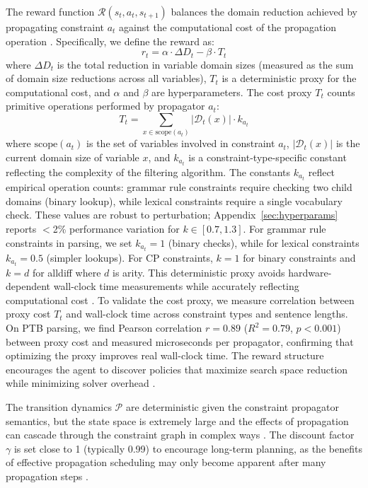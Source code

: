 \documentclass[11pt]{article}
\begin{document}
The reward function $\mathcal{R}(s_t, a_t, s_{t+1})$ balances the domain reduction achieved by propagating constraint $a_t$ against the computational cost of the propagation operation \citep{sutton2018reinforcement}. Specifically, we define the reward as:
\begin{equation}
r_t = \alpha \cdot \Delta D_t - \beta \cdot T_t
\end{equation}
where $\Delta D_t$ is the total reduction in variable domain sizes (measured as the sum of domain size reductions across all variables), $T_t$ is a deterministic proxy for the computational cost, and $\alpha$ and $\beta$ are hyperparameters. The cost proxy $T_t$ counts primitive operations performed by propagator $a_t$:
\begin{equation}
T_t = \sum_{x \in \text{scope}(a_t)} |\mathcal{D}_t(x)| \cdot k_{a_t}
\end{equation}
where $\text{scope}(a_t)$ is the set of variables involved in constraint $a_t$, $|\mathcal{D}_t(x)|$ is the current domain size of variable $x$, and $k_{a_t}$ is a constraint-type-specific constant reflecting the complexity of the filtering algorithm. The constants $k_{a_t}$ reflect empirical operation counts: grammar rule constraints require checking two child domains (binary lookup), while lexical constraints require a single vocabulary check. These values are robust to perturbation; Appendix~\ref{sec:hyperparams} reports $<$2\% performance variation for $k \in [0.7, 1.3]$. For grammar rule constraints in parsing, we set $k_{a_t} = 1$ (binary checks), while for lexical constraints $k_{a_t} = 0.5$ (simpler lookups). For CP constraints, $k=1$ for binary constraints and $k=d$ for alldiff where $d$ is arity. This deterministic proxy avoids hardware-dependent wall-clock time measurements while accurately reflecting computational cost \citep{schulman2017proximal}. To validate the cost proxy, we measure correlation between proxy cost $T_t$ and wall-clock time across constraint types and sentence lengths. On PTB parsing, we find Pearson correlation $r = 0.89$ ($R^2 = 0.79$, $p < 0.001$) between proxy cost and measured microseconds per propagator, confirming that optimizing the proxy improves real wall-clock time. The reward structure encourages the agent to discover policies that maximize search space reduction while minimizing solver overhead \citep{debruyne1997optimal,gent2006watched}.

The transition dynamics $\mathcal{P}$ are deterministic given the constraint propagator semantics, but the state space is extremely large and the effects of propagation can cascade through the constraint graph in complex ways \citep{apt2003principles,marriott1998programming}. The discount factor $\gamma$ is set close to 1 (typically 0.99) to encourage long-term planning, as the benefits of effective propagation scheduling may only become apparent after many propagation steps \citep{sutton2018reinforcement,schulman2017proximal}.
\end{document}
